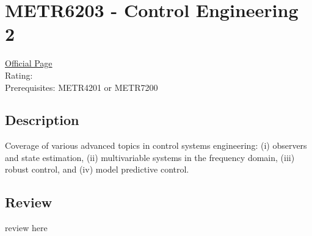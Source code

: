 \hypertarget{METR6203}{\section{METR6203 - Control Engineering 2}}

\large
\textcolor{turbo_purple}{\href{https://my.uq.edu.au/programs-courses/course.html?course_code=METR6203}{Official Page}} \\
Rating: \cstar\cstar\cstar\cstar\ostar \\
Prerequisites: METR4201 or METR7200

\normalsize
\subsection*{Description}
Coverage of various advanced topics in control systems engineering: (i) observers and state estimation, (ii) multivariable systems in the frequency domain, (iii) robust control, and (iv) model predictive control.

\subsection*{Review}
review here
